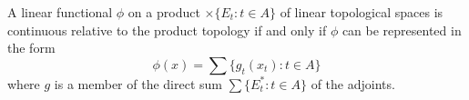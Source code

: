 A linear functional $\phi$ on a product $\times \{E_t: t \in A\}$ of linear topological spaces is continuous relative to the product topology if and only if $\phi$ can be represented in the form
$$\phi(x) = \sum \{g_t(x_t): t \in A\}$$
where $g$ is a member of the direct sum $\sum \{E_t^*: t \in A\}$ of the adjoints.
